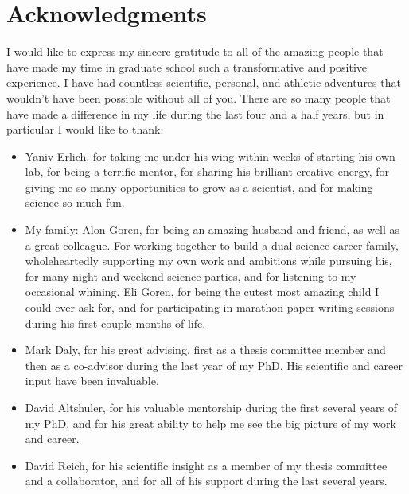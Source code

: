 \section*{Acknowledgments}

I would like to express my sincere gratitude to all of the amazing people that have made my time in graduate school such a transformative and positive experience. I have had countless scientific, personal, and athletic adventures that wouldn't have been possible without all of you. There are so many people that have made a difference in my life during the last four and a half years, but in particular I would like to thank: 

\begin{itemize}

\item Yaniv Erlich, for taking me under his wing within weeks of starting his own lab, for being a terrific mentor, for sharing his brilliant creative energy, for giving me so many opportunities to grow as a scientist, and for making science so much fun.

\item My family: Alon Goren, for being an amazing husband and friend, as well as a great colleague. For
working together to build a dual-science career family, wholeheartedly supporting my own work and ambitions while pursuing his, for many night and weekend science parties, and for listening to my occasional whining. Eli Goren, for being the cutest most amazing child I could ever ask for, and for participating in marathon paper writing sessions during his first couple months of life.

\item Mark Daly, for his great advising, first as a thesis committee member and then as a co-advisor during the last year of my PhD. His scientific and career input have been invaluable.

\item David Altshuler, for his valuable mentorship during the first several years of my PhD, and for his great ability to help me see the big picture of my work and career.

\item David Reich, for his scientific insight as a member of my thesis committee and a collaborator, and for all of his support during the last several years.


\end{itemize}
